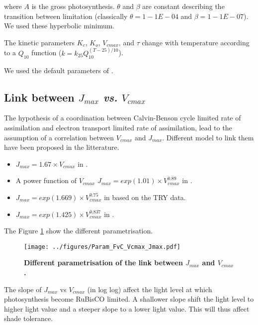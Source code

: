 \documentclass[a4paper,11pt]{article}
\begin{document}
where $A$ is the gross photosynthesis. $\theta$ and $\beta$ are constant describing the transition
between limitation (classically $\theta =1 - 1E-04$ and $\beta = 1 -
1E-07$). We used these hyperbolic minimum.


The kinetic parameters $K_c$, $K_o$, $V_{cmax}$, and $\tau$ change with temperature according to a $Q_{10}$ function ($k = k_{25} Q_{10}^{(T-25)/10}$).

We used the default parameters of \citep{Duursma-2015}.

\clearpage

\subsection{Link between $J_{max}$ \textit{vs.} $V_{cmax}$}

The hypothesis of a coordination between Calvin-Benson cycle limited
rate of assimilation and electron transport limited rate of
assimilation, lead to the assumption of a correlation between $V_{cmax}$ and
$J_{max}$. Different model to link them have been proposed in the
litterature.

\begin{itemize}

\item $J_{max} = 1.67 \times  V_{cmax}$ in \citet{Medlyn-2002}.
  
\item A power function of $V_{cmax}$ $J_{max} = exp(1.01) \times
  V_{cmax}^{0.89}$ in \citet{Walker-2014}.

\item  $J_{max} = exp(1.669) \times V_{cmax}^{0.75}$ in \citet{Kattge-2011} based on the TRY data.

\item $J_{max} = exp(1.425) \times V_{cmax}^{0.837}$ in \citet{Wullschleger-1993}.

\end{itemize}

The Figure \ref{fig:Vcmax_Jmax} show the different parametrisation.

\begin{figure}[ht]
\centering
\texttt{[image: ../figures/Param\_FvC\_Vcmax\_Jmax.pdf]}
\caption{\textbf{Different parametrisation of the link between $J_{max}$ and $V_{cmax}$.}
\label{fig:Vcmax_Jmax}}
\end{figure}

The slope of $J_{max}$ vs $V_{cmax}$ (in log log) affect the light level at which photosynthesis become RuBisCO limited. A shallower slope shift the light level to higher light value and a steeper slope to a lower light value. This will thus affect shade tolerance.
\end{document}
